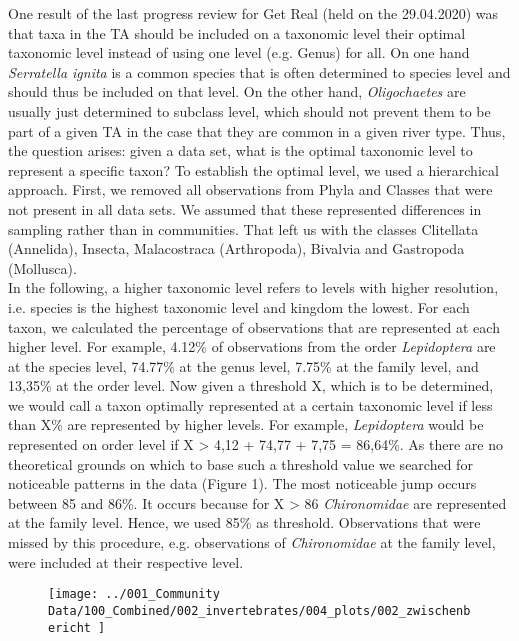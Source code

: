 \documentclass{article}
\begin{document}
	One result of the last progress review for Get Real (held on the 29.04.2020) was that taxa in the TA should be included on a taxonomic level their optimal taxonomic level instead of using one level (e.g. Genus) for all. On one hand \textit{Serratella ignita} is a common species that is often determined to species level and should thus be included on that level. On the other hand, \textit{Oligochaetes} are usually just determined to subclass level, which should not prevent them to be part of a given TA in the case that they are common in a given river type. Thus, the question arises: given a data set, what is the optimal taxonomic level to represent a specific taxon?  
	To establish the optimal level, we used a hierarchical approach. First, we removed all observations from Phyla and Classes that were not present in all data sets. We assumed that these represented differences in sampling rather than in communities. That left us with the classes Clitellata (Annelida), Insecta, Malacostraca (Arthropoda), Bivalvia and Gastropoda (Mollusca). \\
	In the following, a higher taxonomic level refers to levels with higher resolution, i.e. species is the highest taxonomic level and kingdom the lowest. For each taxon, we calculated the percentage of observations that are represented at each higher level. For example, 4.12\% of observations from the order \textit{Lepidoptera} are at the species level, 74.77\% at the genus level, 7.75\% at the family level, and 13,35\% at the order level. Now given a threshold X, which is to be determined, we would call a taxon optimally represented at a certain taxonomic level if less than X\% are represented by higher levels. For example, \textit{Lepidoptera} would be represented on order level if X > 4,12 + 74,77 + 7,75 = 86,64\%. As there are no theoretical grounds on which to base such a threshold value we searched for noticeable patterns in the data (Figure 1). The most noticeable jump occurs between 85 and 86\%. It occurs because for X > 86 \textit{Chironomidae} are represented at the family level. Hence, we used 85\% as threshold. Observations that were missed by this procedure, e.g. observations of \textit{Chironomidae} at the family level, were included at their respective level.    
	
	\begin{figure}
		\texttt{[image: ../001\_Community Data/100\_Combined/002\_invertebrates/004\_plots/002\_zwischenbericht	]}
	\end{figure}
	
\end{document}
